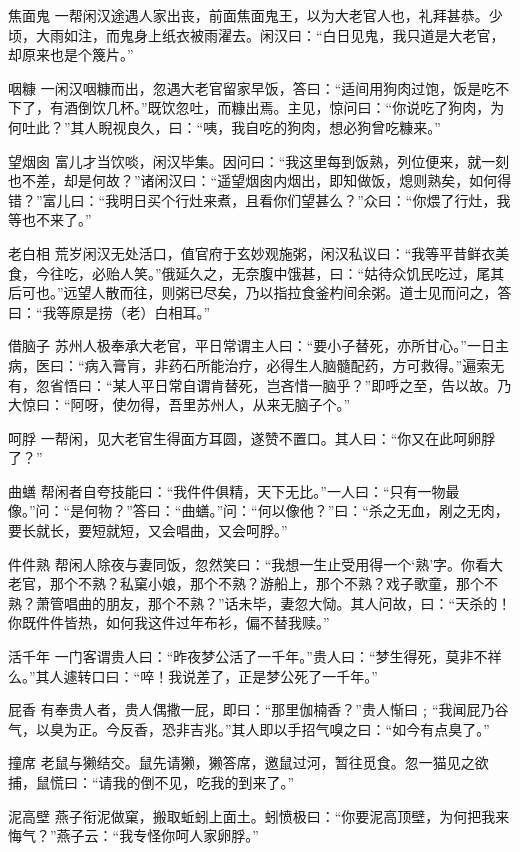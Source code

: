 \documentclass[12pt,UTF8]{ctexbook}
\begin{document}
焦面鬼
一帮闲汉途遇人家出丧，前面焦面鬼王，以为大老官人也，礼拜甚恭。少顷，大雨如注，而鬼身上纸衣被雨濯去。闲汉曰：“白日见鬼，我只道是大老官，却原来也是个篾片。”

咽糠
一闲汉咽糠而出，忽遇大老官留家早饭，答曰：“适间用狗肉过饱，饭是吃不下了，有酒倒饮几杯。”既饮忽吐，而糠出焉。主见，惊问曰：“你说吃了狗肉，为何吐此？”其人睨视良久，曰：“咦，我自吃的狗肉，想必狗曾吃糠来。”

望烟囱
富儿才当饮啖，闲汉毕集。因问曰：“我这里每到饭熟，列位便来，就一刻也不差，却是何故？”诸闲汉曰：“遥望烟囱内烟出，即知做饭，熄则熟矣，如何得错？”富儿曰：“我明日买个行灶来煮，且看你们望甚么？”众曰：“你煨了行灶，我等也不来了。”

老白相
荒岁闲汉无处活口，值官府于玄妙观施粥，闲汉私议曰：“我等平昔鲜衣美食，今往吃，必贻人笑。”俄延久之，无奈腹中饿甚，曰：“姑待众饥民吃过，尾其后可也。”远望人散而往，则粥已尽矣，乃以指拉食釜杓间余粥。道士见而问之，答曰：“我等原是捞（老）白相耳。”

借脑子
苏州人极奉承大老官，平日常谓主人曰：“要小子替死，亦所甘心。”一日主病，医曰：“病入膏肓，非药石所能治疗，必得生人脑髓配药，方可救得。”遍索无有，忽省悟曰：“某人平日常自谓肯替死，岂吝惜一脑乎？”即呼之至，告以故。乃大惊曰：“阿呀，使勿得，吾里苏州人，从来无脑子个。”

呵脬
一帮闲，见大老官生得面方耳圆，遂赞不置口。其人曰：“你又在此呵卵脬了？”

曲蟮
帮闲者自夸技能曰：“我件件俱精，天下无比。”一人曰：“只有一物最像。”问：“是何物？”答曰：“曲蟮。”问：“何以像他？”曰：“杀之无血，剐之无肉，要长就长，要短就短，又会唱曲，又会呵脬。”

件件熟
帮闲人除夜与妻同饭，忽然笑曰：“我想一生止受用得一个‘熟’字。你看大老官，那个不熟？私窠小娘，那个不熟？游船上，那个不熟？戏子歌童，那个不熟？萧管唱曲的朋友，那个不熟？”话未毕，妻忽大恸。其人问故，曰：“天杀的！你既件件皆热，如何我这件过年布衫，偏不替我赎。”

活千年
一门客谓贵人曰：“昨夜梦公活了一千年。”贵人曰：“梦生得死，莫非不祥么。”其人遽转口曰：“啐！我说差了，正是梦公死了一千年。”

屁香
有奉贵人者，贵人偶撒一屁，即曰：“那里伽楠香？”贵人惭曰﹔“我闻屁乃谷气，以臭为正。今反香，恐非吉兆。”其人即以手招气嗅之曰：“如今有点臭了。”

撞席
老鼠与獭结交。鼠先请獭，獭答席，邀鼠过河，暂往觅食。忽一猫见之欲捕，鼠慌曰：“请我的倒不见，吃我的到来了。”

泥高壁
燕子衔泥做窠，搬取蚯蚓上面土。蚓愤极曰：“你要泥高顶壁，为何把我来悔气？”燕子云：“我专怪你呵人家卵脬。”
\end{document}
